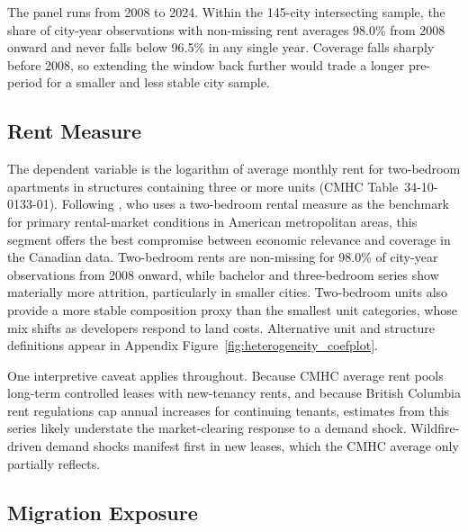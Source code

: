 \documentclass[12pt]{article}
\begin{document}
The panel runs from 2008 to 2024. Within the 145-city intersecting sample,
the share of city-year observations with non-missing rent averages 98.0\%
from 2008 onward and never falls below 96.5\% in any single year. Coverage
falls sharply before 2008, so extending the window back further would trade
a longer pre-period for a smaller and less stable city sample.

\subsection{Rent Measure}

The dependent variable is the logarithm of average monthly rent for
two-bedroom apartments in structures containing three or more units (CMHC
Table~34-10-0133-01). Following \citet{saiz2007}, who uses a two-bedroom
rental measure as the benchmark for primary rental-market conditions in
American metropolitan areas, this segment offers the best compromise
between economic relevance and coverage in the Canadian data. Two-bedroom
rents are non-missing for 98.0\% of city-year observations from 2008
onward, while bachelor and three-bedroom series show materially more
attrition, particularly in smaller cities. Two-bedroom units also provide
a more stable composition proxy than the smallest unit categories, whose
mix shifts as developers respond to land costs. Alternative unit and
structure definitions appear in Appendix Figure~\ref{fig:heterogeneity_coefplot}.

One interpretive caveat applies throughout. Because CMHC average rent
pools long-term controlled leases with new-tenancy rents, and because
British Columbia rent regulations cap annual increases for continuing
tenants, estimates from this series likely understate the market-clearing
response to a demand shock. Wildfire-driven demand shocks manifest first
in new leases, which the CMHC average only partially reflects.

\subsection{Migration Exposure}
\end{document}
